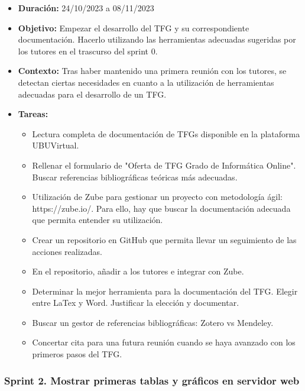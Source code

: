 \begin{itemize}
\item  
\textbf{Duración:} 24/10/2023 a 08/11/2023

\item
\textbf{Objetivo:} Empezar el desarrollo del TFG y su correspondiente documentación. Hacerlo utilizando las herramientas adecuadas sugeridas por los tutores en el trascurso del sprint 0. 

\item
\textbf{Contexto:} Tras haber mantenido una primera reunión con los tutores, se detectan ciertas necesidades en cuanto a la utilización de herramientas adecuadas para el desarrollo de un TFG. 

\item
\textbf{Tareas:}
	\begin{itemize}
	\tightlist
	\item 
	Lectura completa de documentación de TFGs disponible en la plataforma UBUVirtual. 
	\item 	
	Rellenar el formulario de "Oferta de TFG Grado de Informática Online". Buscar referencias bibliográficas teóricas más adecuadas. 
	\item 
	Utilización de Zube para gestionar un proyecto con metodología ágil: https://zube.io/. Para ello, hay que buscar la documentación adecuada que permita entender su utilización.
  	\item 
  	Crear un repositorio en GitHub que permita llevar un seguimiento de las acciones realizadas. 
  	\item 
  	En el repositorio, añadir a los tutores e integrar con Zube. 
	\item 
	Determinar la mejor herramienta para la documentación del TFG. Elegir entre LaTex y Word. Justificar la elección y documentar. 
  	\item 
  	Buscar un gestor de referencias bibliográficas: Zotero vs Mendeley. 
  	\item 
  	Concertar cita para una futura reunión cuando se haya avanzado con los primeros pasos del TFG.
  	\end{itemize}
\end{itemize}


\subsubsection{Sprint 2. Mostrar primeras tablas y gráficos en servidor web}

